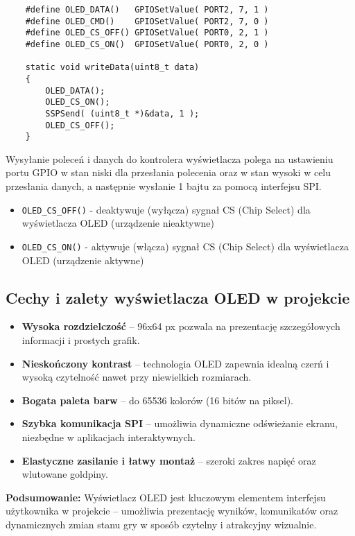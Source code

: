 \documentclass[a4paper,12pt]{report}
\begin{document}
  \begin{lstlisting}
    #define OLED_DATA()   GPIOSetValue( PORT2, 7, 1 )
    #define OLED_CMD()    GPIOSetValue( PORT2, 7, 0 )
    #define OLED_CS_OFF() GPIOSetValue( PORT0, 2, 1 )
    #define OLED_CS_ON()  GPIOSetValue( PORT0, 2, 0 )

    static void writeData(uint8_t data)
    {
        OLED_DATA();
        OLED_CS_ON();
        SSPSend( (uint8_t *)&data, 1 );
        OLED_CS_OFF();
    }
  \end{lstlisting}
  Wysyłanie poleceń i danych do kontrolera wyświetlacza polega na ustawieniu portu GPIO w stan niski dla przesłania polecenia oraz w stan wysoki w celu przesłania danych, a następnie wysłanie 1 bajtu za pomocą interfejsu SPI.
  \begin{itemize}
    \item \texttt{OLED\_CS\_OFF()} - deaktywuje (wyłącza) sygnał CS (Chip Select) dla wyświetlacza OLED (urządzenie nieaktywne)
    \item \texttt{OLED\_CS\_ON()} - aktywuje (włącza) sygnał CS (Chip Select) dla wyświetlacza OLED (urządzenie aktywne)
    
  \end{itemize}

\subsection{Cechy i zalety wyświetlacza OLED w projekcie}

\begin{itemize}
    \item \textbf{Wysoka rozdzielczość} – 96x64 px pozwala na prezentację szczegółowych informacji i prostych grafik.
    \item \textbf{Nieskończony kontrast} – technologia OLED zapewnia idealną czerń i wysoką czytelność nawet przy niewielkich rozmiarach.
    \item \textbf{Bogata paleta barw} – do 65536 kolorów (16 bitów na piksel).
    \item \textbf{Szybka komunikacja SPI} – umożliwia dynamiczne odświeżanie ekranu, niezbędne w aplikacjach interaktywnych.
    \item \textbf{Elastyczne zasilanie i łatwy montaż} – szeroki zakres napięć oraz wlutowane goldpiny.
\end{itemize}

\textbf{Podsumowanie:} Wyświetlacz OLED jest kluczowym elementem interfejsu użytkownika w projekcie – umożliwia prezentację wyników, komunikatów oraz dynamicznych zmian stanu gry w sposób czytelny i atrakcyjny wizualnie.
\end{document}
